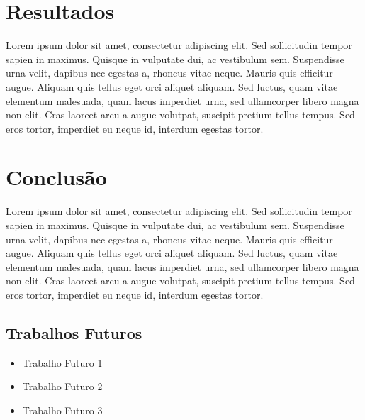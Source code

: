 \documentclass[
	12pt,				%
	openright,			%
	oneside,			%
	a4paper,			%
	english,			%
	brazil				%
	]{abntex2}
\begin{document}
 \chapter{Resultados}

 Lorem ipsum dolor sit amet, consectetur adipiscing elit. Sed sollicitudin tempor sapien in maximus. Quisque in vulputate dui, ac vestibulum sem. Suspendisse urna velit, dapibus nec egestas a, rhoncus vitae neque. Mauris quis efficitur augue. Aliquam quis tellus eget orci aliquet aliquam. Sed luctus, quam vitae elementum malesuada, quam lacus imperdiet urna, sed ullamcorper libero magna non elit. Cras laoreet arcu a augue volutpat, suscipit pretium tellus tempus. Sed eros tortor, imperdiet eu neque id, interdum egestas tortor.

 \chapter{Conclusão}

 Lorem ipsum dolor sit amet, consectetur adipiscing elit. Sed sollicitudin tempor sapien in maximus. Quisque in vulputate dui, ac vestibulum sem. Suspendisse urna velit, dapibus nec egestas a, rhoncus vitae neque. Mauris quis efficitur augue. Aliquam quis tellus eget orci aliquet aliquam. Sed luctus, quam vitae elementum malesuada, quam lacus imperdiet urna, sed ullamcorper libero magna non elit. Cras laoreet arcu a augue volutpat, suscipit pretium tellus tempus. Sed eros tortor, imperdiet eu neque id, interdum egestas tortor.

 \section{Trabalhos Futuros}

\begin{itemize}
    \item Trabalho Futuro 1
    \item Trabalho Futuro 2
    \item Trabalho Futuro 3
\end{itemize}

\postextual


\end{document}
